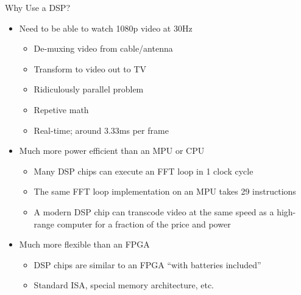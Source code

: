 \documentclass{beamer}
\begin{document}
\begin{frame}{Why Use a DSP?}
    \begin{itemize}
        \item Need to be able to watch 1080p video at 30Hz
            \begin{itemize}
                \item De-muxing video from cable/antenna
                \item Transform to video out to TV
                \item Ridiculously parallel problem
                \item Repetive math
                \item Real-time; around 3.33ms per frame
            \end{itemize}
        \item Much more power efficient than an MPU or CPU
            \begin{itemize}
                \item Many DSP chips can execute an FFT loop in 1 clock cycle
                \item The same FFT loop implementation on an MPU takes 29
                    instructions
                \item A modern DSP chip can transcode video at the same speed
                    as a high-range computer for a fraction of the price and
                    power
            \end{itemize}
        \item Much more flexible than an FPGA
            \begin{itemize}
                \item DSP chips are similar to an FPGA ``with batteries
                    included''
                \item Standard ISA, special memory architecture, etc.
            \end{itemize}
    \end{itemize}
\end{frame}
\end{document}
